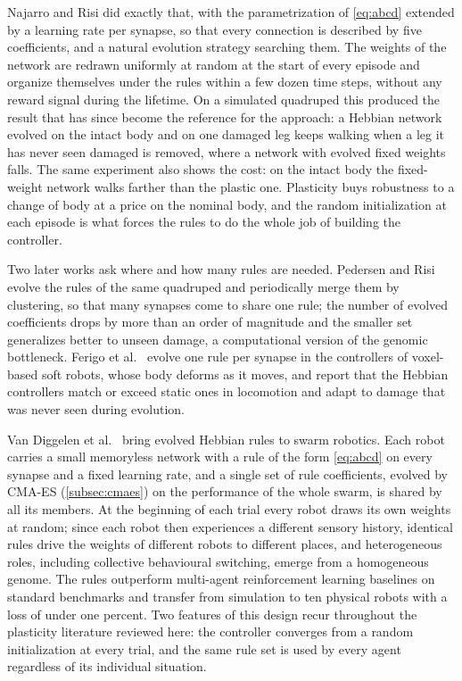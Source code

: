 Najarro and Risi \cite{najarro2020meta} did exactly that, with the parametrization of \eqref{eq:abcd} extended by a learning rate per synapse, so that every connection is described by five coefficients, and a natural evolution strategy \cite{salimans2017evolution} searching them. The weights of the network are redrawn uniformly at random at the start of every episode and organize themselves under the rules within a few dozen time steps, without any reward signal during the lifetime. On a simulated quadruped this produced the result that has since become the reference for the approach: a Hebbian network evolved on the intact body and on one damaged leg keeps walking when a leg it has never seen damaged is removed, where a network with evolved fixed weights falls. The same experiment also shows the cost: on the intact body the fixed-weight network walks farther than the plastic one. Plasticity buys robustness to a change of body at a price on the nominal body, and the random initialization at each episode is what forces the rules to do the whole job of building the controller.

Two later works ask where and how many rules are needed. Pedersen and Risi \cite{pedersen2021evolving} evolve the rules of the same quadruped and periodically merge them by clustering, so that many synapses come to share one rule; the number of evolved coefficients drops by more than an order of magnitude and the smaller set generalizes better to unseen damage, a computational version of the genomic bottleneck. Ferigo et al.\ \cite{ferigo2023evolving} evolve one rule per synapse in the controllers of voxel-based soft robots, whose body deforms as it moves, and report that the Hebbian controllers match or exceed static ones in locomotion and adapt to damage that was never seen during evolution.

Van Diggelen et al.\ \cite{vandiggelen2025emergent} bring evolved Hebbian rules to swarm robotics. Each robot carries a small memoryless network with a rule of the form \eqref{eq:abcd} on every synapse and a fixed learning rate, and a single set of rule coefficients, evolved by CMA-ES (\autoref{subsec:cmaes}) on the performance of the whole swarm, is shared by all its members. At the beginning of each trial every robot draws its own weights at random; since each robot then experiences a different sensory history, identical rules drive the weights of different robots to different places, and heterogeneous roles, including collective behavioural switching, emerge from a homogeneous genome. The rules outperform multi-agent reinforcement learning baselines on standard benchmarks and transfer from simulation to ten physical robots with a loss of under one percent. Two features of this design recur throughout the plasticity literature reviewed here: the controller converges from a random initialization at every trial, and the same rule set is used by every agent regardless of its individual situation.

